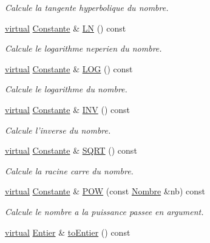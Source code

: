 \begin{DoxyCompactItemize}
\begin{DoxyCompactList}\small\item\em \-Calcule la tangente hyperbolique du nombre. \end{DoxyCompactList}\item 
\hyperlink{classvirtual}{virtual} \hyperlink{class_l_o21_1_1_constante}{\-Constante} \& \hyperlink{class_l_o21_1_1_nombre_aa66572023ae408b6b2c8fc6babe2b9c9}{\-L\-N} () const 
\begin{DoxyCompactList}\small\item\em \-Calcule le logarithme neperien du nombre. \end{DoxyCompactList}\item 
\hyperlink{classvirtual}{virtual} \hyperlink{class_l_o21_1_1_constante}{\-Constante} \& \hyperlink{class_l_o21_1_1_nombre_aad5958e0b3583453b548e8369470a77f}{\-L\-O\-G} () const 
\begin{DoxyCompactList}\small\item\em \-Calcule le logarithme du nombre. \end{DoxyCompactList}\item 
\hyperlink{classvirtual}{virtual} \hyperlink{class_l_o21_1_1_constante}{\-Constante} \& \hyperlink{class_l_o21_1_1_nombre_a143b8821200279ae56a13531c94d891f}{\-I\-N\-V} () const 
\begin{DoxyCompactList}\small\item\em \-Calcule l'inverse du nombre. \end{DoxyCompactList}\item 
\hyperlink{classvirtual}{virtual} \hyperlink{class_l_o21_1_1_constante}{\-Constante} \& \hyperlink{class_l_o21_1_1_nombre_adac454c03cc80ab403fe1346e067be0b}{\-S\-Q\-R\-T} () const 
\begin{DoxyCompactList}\small\item\em \-Calcule la racine carre du nombre. \end{DoxyCompactList}\item 
\hyperlink{classvirtual}{virtual} \hyperlink{class_l_o21_1_1_constante}{\-Constante} \& \hyperlink{class_l_o21_1_1_nombre_a80021d921a8519d3548a11b2d6acea7d}{\-P\-O\-W} (const \hyperlink{class_l_o21_1_1_nombre}{\-Nombre} \&nb) const 
\begin{DoxyCompactList}\small\item\em \-Calcule le nombre a la puissance passee en argument. \end{DoxyCompactList}\item 
\hyperlink{classvirtual}{virtual} \hyperlink{class_l_o21_1_1_entier}{\-Entier} \& \hyperlink{class_l_o21_1_1_nombre_a50ad2148d1f0de749361329268117a25}{to\-Entier} () const 

\end{DoxyCompactItemize}
